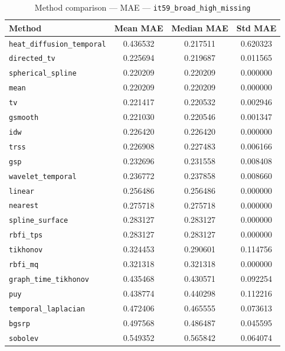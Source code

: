 \begin{table}[ht]
\centering
\caption{Method comparison — MAE — \texttt{it59_broad_high_missing}}
\label{tab:mae_it59_broad_high_missing}
\begin{tabular}{lccc}
\hline
Method & Mean MAE & Median MAE & Std MAE \\
\hline
\texttt{heat_diffusion_temporal} & 0.436532 & 0.217511 & 0.620323 \\
\texttt{directed_tv} & 0.225694 & 0.219687 & 0.011565 \\
\texttt{spherical_spline} & 0.220209 & 0.220209 & 0.000000 \\
\texttt{mean} & 0.220209 & 0.220209 & 0.000000 \\
\texttt{tv} & 0.221417 & 0.220532 & 0.002946 \\
\texttt{gsmooth} & 0.221030 & 0.220546 & 0.001347 \\
\texttt{idw} & 0.226420 & 0.226420 & 0.000000 \\
\texttt{trss} & 0.226908 & 0.227483 & 0.006166 \\
\texttt{gsp} & 0.232696 & 0.231558 & 0.008408 \\
\texttt{wavelet_temporal} & 0.236772 & 0.237858 & 0.008660 \\
\texttt{linear} & 0.256486 & 0.256486 & 0.000000 \\
\texttt{nearest} & 0.275718 & 0.275718 & 0.000000 \\
\texttt{spline_surface} & 0.283127 & 0.283127 & 0.000000 \\
\texttt{rbfi_tps} & 0.283127 & 0.283127 & 0.000000 \\
\texttt{tikhonov} & 0.324453 & 0.290601 & 0.114756 \\
\texttt{rbfi_mq} & 0.321318 & 0.321318 & 0.000000 \\
\texttt{graph_time_tikhonov} & 0.435468 & 0.430571 & 0.092254 \\
\texttt{puy} & 0.438774 & 0.440298 & 0.112216 \\
\texttt{temporal_laplacian} & 0.472406 & 0.465555 & 0.073613 \\
\texttt{bgsrp} & 0.497568 & 0.486487 & 0.045595 \\
\texttt{sobolev} & 0.549352 & 0.565842 & 0.064074 \\
\hline
\end{tabular}
\end{table}
